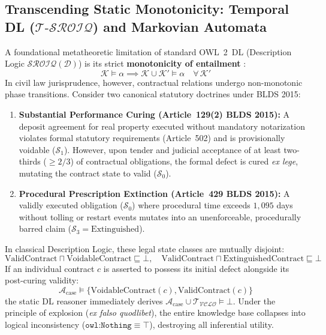 \documentclass[11pt,a4paper]{article}
\begin{document}
\subsection[Transcending Monotonicity via Temporal DL]{Transcending Static Monotonicity: Temporal DL ($\mathcal{T}\text{-}\mathcal{SROIQ}$) and Markovian Automata}
\label{sec:temporal_dl_bridge}
A foundational metatheoretic limitation of standard OWL~2~DL (Description Logic $\mathcal{SROIQ}(\mathcal{D})$) is its strict \textbf{monotonicity of entailment} \citep{horrocks2006even, baader2003description}:
\begin{equation}
\label{eq:monotonicity}
\mathcal{K} \models \alpha \implies \mathcal{K} \cup \mathcal{K}' \models \alpha \quad \forall \, \mathcal{K}'
\end{equation}
In civil law jurisprudence, however, contractual relations undergo non-monotonic phase transitions. Consider two canonical statutory doctrines under BLDS 2015:
\begin{enumerate}[leftmargin=*]
    \item \textbf{Substantial Performance Curing (Article~129(2) BLDS 2015):} A deposit agreement for real property executed without mandatory notarization violates formal statutory requirements (Article~502) and is provisionally voidable ($\mathcal{S}_1$). However, upon tender and judicial acceptance of at least two-thirds ($\ge 2/3$) of contractual obligations, the formal defect is cured \textit{ex lege}, mutating the contract state to valid ($\mathcal{S}_0$).
    \item \textbf{Procedural Prescription Extinction (Article~429 BLDS 2015):} A validly executed obligation ($\mathcal{S}_0$) where procedural time exceeds $1,095$ days without tolling or restart events mutates into an unenforceable, procedurally barred claim ($\mathcal{S}_3 = \text{Extinguished}$).
\end{enumerate}
In classical Description Logic, these legal state classes are mutually disjoint:
\begin{equation}
\text{ValidContract} \sqcap \text{VoidableContract} \sqsubseteq \bot, \quad \text{ValidContract} \sqcap \text{ExtinguishedContract} \sqsubseteq \bot
\end{equation}
If an individual contract $c$ is asserted to possess its initial defect alongside its post-curing validity:
\begin{equation}
\mathcal{A}_{\text{case}} \models \{ \text{VoidableContract}(c), \text{ValidContract}(c) \}
\end{equation}
the static DL reasoner immediately derives $\mathcal{A}_{\text{case}} \cup \mathcal{T}_{\mathcal{VCLO}} \models \bot$. Under the principle of explosion (\textit{ex falso quodlibet}), the entire knowledge base collapses into logical inconsistency ($\texttt{owl:Nothing} \equiv \top$), destroying all inferential utility.
\end{document}
